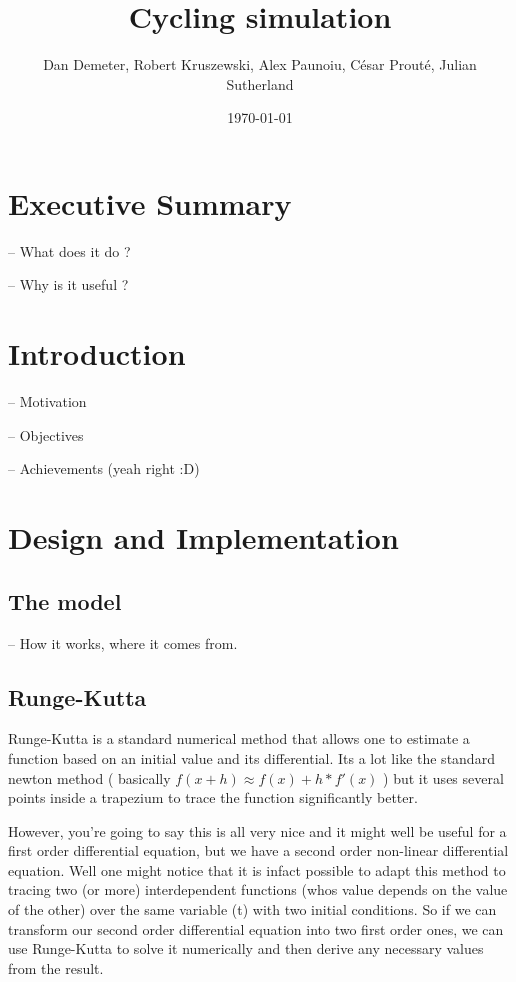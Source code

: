 \documentclass[10pt, a4paper]{report}
\title{Cycling simulation}
\date{\today}
\author{Dan Demeter, Robert Kruszewski, Alex Paunoiu, C\'esar Prout\'e, Julian Sutherland}
\begin{document}
\maketitle

\chapter{Executive Summary}

-- What does it do ?

-- Why is it useful ?

\chapter{Introduction}

-- Motivation

-- Objectives

-- Achievements (yeah right :D)

\chapter{Design and Implementation}

\section{The model}

-- How it works, where it comes from.

\section{Runge-Kutta}


Runge-Kutta is a standard numerical method that allows one to estimate a function based on an initial value and its differential. Its a lot like the standard newton method ( basically $f(x + h) \approx f(x) + h*f'(x)$ ) but it uses several points inside a trapezium to trace the function significantly better.

However, you're going to say this is all very nice and it might well be useful for a first order differential equation, but we have a second order non-linear differential equation. Well one might notice that it is infact possible to adapt this method to tracing two (or more) interdependent functions (whos value depends on the value of the other) over the same variable (t) with two initial conditions. So if we can transform our second order differential equation into two first order ones, we can use Runge-Kutta to solve it numerically and then derive any necessary values from the result.
\end{document}
